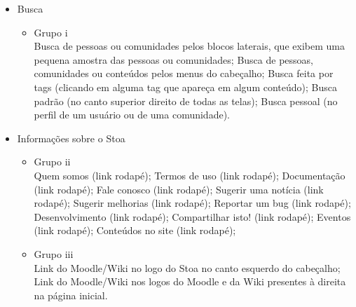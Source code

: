 \begin{itemize}
\item Busca \\
    \begin{itemize}
    \item Grupo i\\
    Busca de pessoas ou comunidades pelos blocos laterais, que exibem uma pequena amostra das pessoas ou comunidades; Busca de pessoas, comunidades ou conteúdos pelos menus do cabeçalho; Busca feita por tags (clicando em alguma tag que apareça em algum conteúdo); Busca padrão (no canto superior direito de todas as telas); Busca pessoal (no perfil de um usuário ou de uma comunidade).
    \end{itemize}

\item Informações sobre o Stoa \\
    \begin{itemize}
    \item Grupo ii\\
    Quem somos (link rodapé); Termos de uso (link rodapé); Documentação (link rodapé); Fale conosco (link rodapé); Sugerir uma notícia (link rodapé); Sugerir melhorias (link rodapé); Reportar um bug (link rodapé); Desenvolvimento (link rodapé); Compartilhar isto! (link rodapé); Eventos (link rodapé); Conteúdos no site (link rodapé);
    \item Grupo iii\\
    Link do Moodle/Wiki no logo do Stoa no canto esquerdo do cabeçalho; Link do Moodle/Wiki nos logos do Moodle e da Wiki presentes à direita na página inicial.
    \end{itemize}


\end{itemize}

